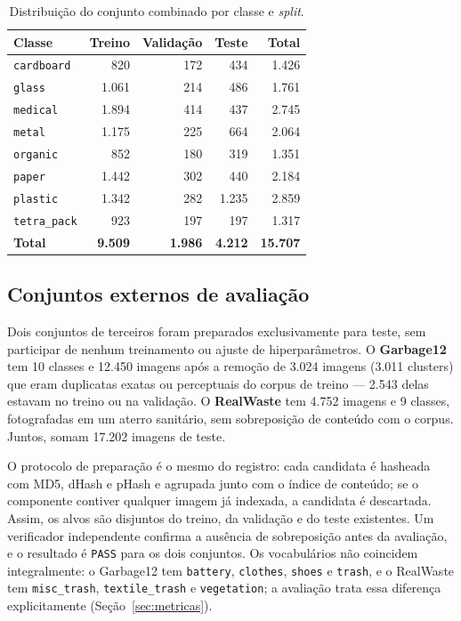 \documentclass[11pt,a4paper]{article}
\begin{document}
	\begin{table}[htbp]
		\centering
		\small
		\caption{Distribuição do conjunto combinado por classe e \textit{split}.}
		\label{tab:classes}
		\begin{tabular}{lrrrr}
			\toprule
			\textbf{Classe} & \textbf{Treino} & \textbf{Validação} & \textbf{Teste} & \textbf{Total} \\
			\midrule
			\texttt{cardboard} & 820 & 172 & 434 & 1.426 \\
			\texttt{glass} & 1.061 & 214 & 486 & 1.761 \\
			\texttt{medical} & 1.894 & 414 & 437 & 2.745 \\
			\texttt{metal} & 1.175 & 225 & 664 & 2.064 \\
			\texttt{organic} & 852 & 180 & 319 & 1.351 \\
			\texttt{paper} & 1.442 & 302 & 440 & 2.184 \\
			\texttt{plastic} & 1.342 & 282 & 1.235 & 2.859 \\
			\texttt{tetra\_pack} & 923 & 197 & 197 & 1.317 \\
			\midrule
			\textbf{Total} & \textbf{9.509} & \textbf{1.986} & \textbf{4.212} & \textbf{15.707} \\
			\bottomrule
		\end{tabular}
	\end{table}
	
	\subsection{Conjuntos externos de avaliação}
	
	Dois conjuntos de terceiros foram preparados exclusivamente para teste, sem participar de nenhum treinamento ou ajuste de hiperparâmetros. O \textbf{Garbage12} \cite{kaggle_garbage12} tem 10 classes e 12.450 imagens após a remoção de 3.024 imagens (3.011 clusters) que eram duplicatas exatas ou perceptuais do corpus de treino --- 2.543 delas estavam no treino ou na validação. O \textbf{RealWaste} \cite{single2023} tem 4.752 imagens e 9 classes, fotografadas em um aterro sanitário, sem sobreposição de conteúdo com o corpus. Juntos, somam 17.202 imagens de teste.
	
	O protocolo de preparação é o mesmo do registro: cada candidata é hasheada com MD5, dHash e pHash e agrupada junto com o índice de conteúdo; se o componente contiver qualquer imagem já indexada, a candidata é descartada. Assim, os alvos são disjuntos do treino, da validação e do teste existentes. Um verificador independente confirma a ausência de sobreposição antes da avaliação, e o resultado é \texttt{PASS} para os dois conjuntos. Os vocabulários não coincidem integralmente: o Garbage12 tem \texttt{battery}, \texttt{clothes}, \texttt{shoes} e \texttt{trash}, e o RealWaste tem \texttt{misc\_trash}, \texttt{textile\_trash} e \texttt{vegetation}; a avaliação trata essa diferença explicitamente (Seção~\ref{sec:metricas}).
	
\end{document}
